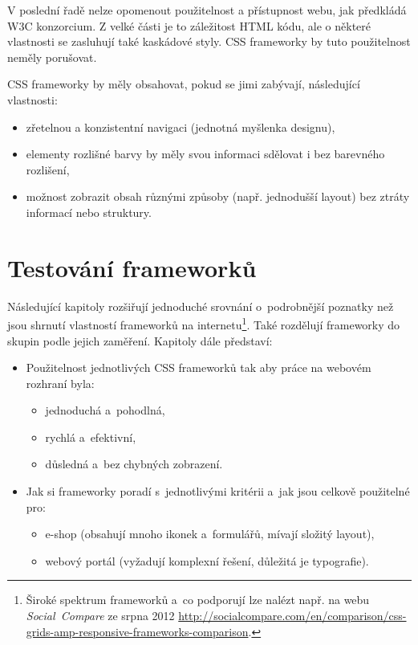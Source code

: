 \documentclass[thesis=B,czech]{FITthesis}[2012/06/26]
\begin{document}
V poslední řadě nelze opomenout použitelnost a přístupnost webu, jak předkládá \gls{W3C} konzorcium. Z velké části je to záležitost \gls{HTML} kódu, ale o některé vlastnosti se zasluhují také kaskádové styly. \gls{CSS} frameworky by tuto použitelnost neměly porušovat. 

\gls{CSS} frameworky by měly obsahovat, pokud se jimi zabývají, následující vlastnosti:
\begin{itemize}
 	\item zřetelnou a konzistentní navigaci (jednotná myšlenka designu),
 	\item elementy rozlišné barvy by měly svou informaci sdělovat i bez barevného rozlišení,
 	\item možnost zobrazit obsah různými způsoby (např. jednodušší layout) bez ztráty informací nebo struktury.\cite{wcag}
\end{itemize}


\chapter{Testování frameworků}
Následující kapitoly rozšiřují jednoduché srovnání o~podrobnější poznatky než jsou shrnutí vlastností frameworků na internetu\footnote{Široké spektrum frameworků a~co podporují lze nalézt např. na webu \textit{Social~Compare} ze srpna 2012 \url{http://socialcompare.com/en/comparison/css-grids-amp-responsive-frameworks-comparison}.}. Také rozdělují frameworky  do skupin podle jejich zaměření. 
Kapitoly dále představí:

\begin{itemize}
  \item Použitelnost jednotlivých \gls{CSS} frameworků tak aby práce na webovém rozhraní byla:
	\begin{itemize}
 	\item jednoduchá a~pohodlná,
 	\item rychlá a~efektivní,
 	\item důsledná a~bez chybných zobrazení.
	\end{itemize}

 \item Jak si frameworky poradí s~jednotlivými kritérii a~jak jsou celkově použitelné pro:

\begin{itemize}
 \item e-shop (obsahují mnoho ikonek a~formulářů, mívají složitý layout),
 \item webový portál (vyžadují komplexní řešení, důležitá je typografie).
\end{itemize}
\end{itemize}
\end{document}
